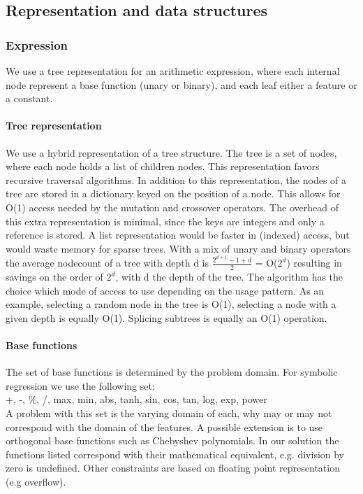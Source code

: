 \subsection{Representation and data structures}\label{subsectree}
\subsubsection{Expression}
We use a tree representation for an arithmetic expression, where each internal node represent a base function (unary or binary), and each leaf either a feature or a constant.

\paragraph{Tree representation}
We use a hybrid representation of a tree structure. The tree is a set of nodes, where each node holds a list of children nodes. This representation favors recursive traversal algorithms. In addition to this representation, the nodes of a tree are stored in a dictionary keyed on the position of a node. This allows for O(1) access needed by the mutation and crossover operators. The overhead of this extra representation is minimal, since the keys are integers and only a reference is stored. A list representation would be faster in (indexed) access, but would waste memory for sparse trees. With a mix of unary and binary operators the average nodecount of a tree with depth d is $\frac{2^{d+1}-1  + d}{2}$ = O($2^d$) resulting in savings on the order of $2^d$, with d the depth of the tree.
The algorithm has the choice which mode of access to use depending on the usage pattern. As an example, selecting a random node in the tree is O(1), selecting a node with a given depth is equally O(1). Splicing subtrees is equally an O(1) operation.

\paragraph{Base functions}
The set of base functions is determined by the problem domain. For symbolic regression we use the following set:\\
+, -, \%, /, max, min, abs, tanh, sin, cos, tan, log, exp, power\\
A problem with this set is the varying domain of each, why may or may not correspond with the domain of the features. A possible extension is to use orthogonal base functions such as Chebyshev polynomials. In our solution the functions listed correspond with their mathematical equivalent, e.g. division by zero is undefined. Other constraints are based on floating point representation (e.g overflow).

